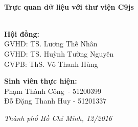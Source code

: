 \HRule \\[0.4cm]
{ \huge \bfseries Trực quan dữ liệu với thư viện C9js}\\[0.4cm] %
\HRule \\[0.8cm]

\begin{flushright}
\begin{minipage}{0.7\textwidth}

\end{minipage}
\end{flushright}

\begin{flushleft} \large
\textbf{Hội đồng:}\\
\tab[2cm] GVHD: TS. Lương Thế Nhân\\
\tab[2cm] GVHD: TS. Huỳnh Tường Nguyên\\
\tab[2cm] GVPB: ThS. Võ Thanh Hùng\\
\end{flushleft}

\begin{flushleft} \large
\textbf{Sinh viên thực hiện:}\\
\tab[2cm] Phạm Thành Công\quad \ - 51200399\\
\tab[2cm] Đỗ Đặng Thanh Huy - 51201337\\[1.5cm]
\end{flushleft}


\large \emph{Thành phố Hồ Chí Minh, 12/2016}

\vfill %

